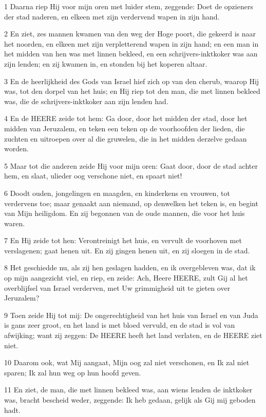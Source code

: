 \par 1 Daarna riep Hij voor mijn oren met luider stem, zeggende: Doet de opzieners der stad naderen, en elkeen met zijn verdervend wapen in zijn hand.
\par 2 En ziet, zes mannen kwamen van den weg der Hoge poort, die gekeerd is naar het noorden, en elkeen met zijn verpletterend wapen in zijn hand; en een man in het midden van hen was met linnen bekleed, en een schrijvers-inktkoker was aan zijn lenden; en zij kwamen in, en stonden bij het koperen altaar.
\par 3 En de heerlijkheid des Gods van Israel hief zich op van den cherub, waarop Hij was, tot den dorpel van het huis; en Hij riep tot den man, die met linnen bekleed was, die de schrijvers-inktkoker aan zijn lenden had.
\par 4 En de HEERE zeide tot hem: Ga door, door het midden der stad, door het midden van Jeruzalem, en teken een teken op de voorhoofden der lieden, die zuchten en uitroepen over al die gruwelen, die in het midden derzelve gedaan worden.
\par 5 Maar tot die anderen zeide Hij voor mijn oren: Gaat door, door de stad achter hem, en slaat, ulieder oog verschone niet, en spaart niet!
\par 6 Doodt ouden, jongelingen en maagden, en kinderkens en vrouwen, tot verdervens toe; maar genaakt aan niemand, op denwelken het teken is, en begint van Mijn heiligdom. En zij begonnen van de oude mannen, die voor het huis waren.
\par 7 En Hij zeide tot hen: Verontreinigt het huis, en vervult de voorhoven met verslagenen; gaat henen uit. En zij gingen henen uit, en zij sloegen in de stad.
\par 8 Het geschiedde nu, als zij hen geslagen hadden, en ik overgebleven was, dat ik op mijn aangezicht viel, en riep, en zeide: Ach, Heere HEERE, zult Gij al het overblijfsel van Israel verderven, met Uw grimmigheid uit te gieten over Jeruzalem?
\par 9 Toen zeide Hij tot mij: De ongerechtigheid van het huis van Israel en van Juda is gans zeer groot, en het land is met bloed vervuld, en de stad is vol van afwijking; want zij zeggen: De HEERE heeft het land verlaten, en de HEERE ziet niet.
\par 10 Daarom ook, wat Mij aangaat, Mijn oog zal niet verschonen, en Ik zal niet sparen; Ik zal hun weg op hun hoofd geven.
\par 11 En ziet, de man, die met linnen bekleed was, aan wiens lenden de inktkoker was, bracht bescheid weder, zeggende: Ik heb gedaan, gelijk als Gij mij geboden hadt.

